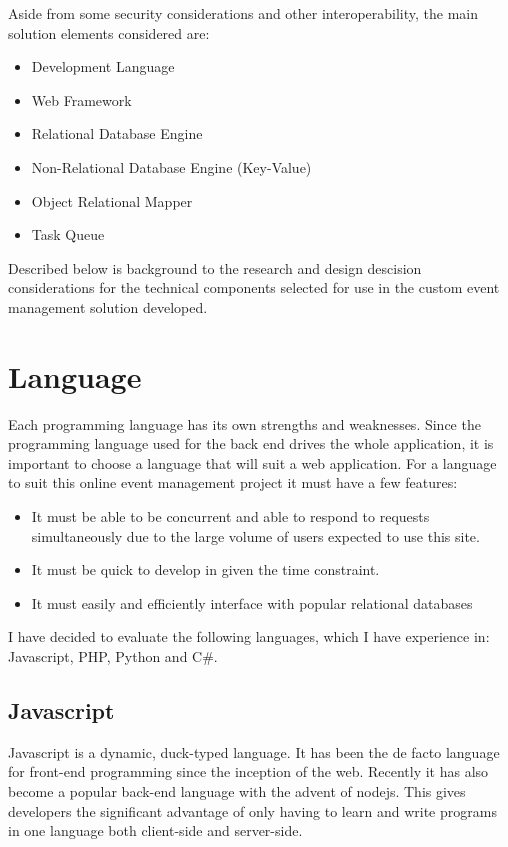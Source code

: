 \documentclass[a4paper,oneside,12pt]{report}
\begin{document}
	Aside from some security considerations and other interoperability, the main solution elements considered are:
	\begin{itemize}
		\item Development Language
		\item Web Framework
		\item Relational Database Engine
		\item Non-Relational Database Engine (Key-Value)
		\item Object Relational Mapper
		\item Task Queue
	\end{itemize}
	Described below is background to the research and design descision considerations for the technical components selected for use in the custom event management solution developed.

	\section{Language}
	Each programming language has its own strengths and weaknesses. Since the programming language used for the back end drives the whole application, it is important to choose a language that will suit a web application. For a language to suit this online event management project it must have a few features:

	\begin{itemize}
		\item It must be able to be concurrent and able to respond to requests simultaneously due to the large volume of users expected to use this site.
		\item It must be quick to develop in given the time constraint.
		\item It must easily and efficiently interface with popular relational databases
	\end{itemize}

	I have decided to evaluate the following languages, which I have experience in: Javascript, PHP, Python and C\#.

	\subsection{Javascript}
	Javascript is a dynamic, duck-typed language. It has been the de facto language for front-end programming since the inception of the web. Recently it has also become a popular back-end language with the advent of nodejs. This gives developers the significant advantage of only having to learn and write programs in one language both client-side and server-side.
\end{document}
